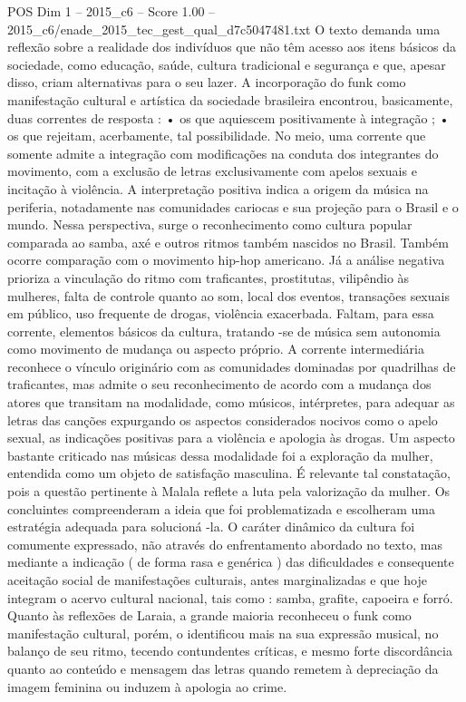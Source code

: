 \begin{textsample}{POS Dim 1 – 2015\_c6 – Score 1.00 – 2015\_c6/enade\_2015\_tec\_gest\_qual\_d7c5047481.txt}
O texto demanda uma reflexão sobre a realidade dos indivíduos que não têm acesso aos itens básicos da sociedade, como educação, saúde, cultura tradicional e segurança e que, apesar disso, criam alternativas para o seu lazer.
A incorporação do funk como manifestação cultural e artística da sociedade brasileira encontrou, basicamente, duas correntes de resposta : • os que aquiescem positivamente à integração ; • os que rejeitam, acerbamente, tal possibilidade.
No meio, uma corrente que somente admite a integração com modificações na conduta dos integrantes do movimento, com a exclusão de letras exclusivamente com apelos sexuais e incitação à violência.
A interpretação positiva indica a origem da música na periferia, notadamente nas comunidades cariocas e sua projeção para o Brasil e o mundo.
Nessa perspectiva, surge o reconhecimento como cultura popular comparada ao samba, axé e outros ritmos também nascidos no Brasil.
Também ocorre comparação com o movimento hip-hop americano.
Já a análise negativa prioriza a vinculação do ritmo com traficantes, prostitutas, vilipêndio às mulheres, falta de controle quanto ao som, local dos eventos, transações sexuais em público, uso frequente de drogas, violência exacerbada.
Faltam, para essa corrente, elementos básicos da cultura, tratando -se de música sem autonomia como movimento de mudança ou aspecto próprio.
A corrente intermediária reconhece o vínculo originário com as comunidades dominadas por quadrilhas de traficantes, mas admite o seu reconhecimento de acordo com a mudança dos atores que transitam na modalidade, como músicos, intérpretes, para adequar as letras das canções expurgando os aspectos considerados nocivos como o apelo sexual, as indicações positivas para a violência e apologia às drogas.
Um aspecto bastante criticado nas músicas dessa modalidade foi a exploração da mulher, entendida como um objeto de satisfação masculina.
É relevante tal constatação, pois a questão pertinente à Malala reflete a luta pela valorização da mulher.
Os concluintes compreenderam a ideia que foi problematizada e escolheram uma estratégia adequada para solucioná -la.
O caráter dinâmico da cultura foi comumente expressado, não através do enfrentamento abordado no texto, mas mediante a indicação ( de forma rasa e genérica ) das dificuldades e consequente aceitação social de manifestações culturais, antes marginalizadas e que hoje integram o acervo cultural nacional, tais como : samba, grafite, capoeira e forró.
Quanto às reflexões de Laraia, a grande maioria reconheceu o funk como manifestação cultural, porém, o identificou mais na sua expressão musical, no balanço de seu ritmo, tecendo contundentes críticas, e mesmo forte discordância quanto ao conteúdo e mensagem das letras quando remetem à depreciação da imagem feminina ou induzem à apologia ao crime.

\end{textsample}

